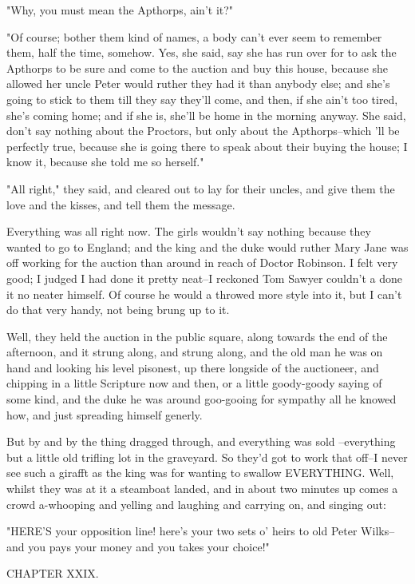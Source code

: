 "Why, you must mean the Apthorps, ain't it?"

"Of course; bother them kind of names, a body can't ever seem to remember
them, half the time, somehow.  Yes, she said, say she has run over for to
ask the Apthorps to be sure and come to the auction and buy this house,
because she allowed her uncle Peter would ruther they had it than anybody
else; and she's going to stick to them till they say they'll come, and
then, if she ain't too tired, she's coming home; and if she is, she'll be
home in the morning anyway.  She said, don't say nothing about the
Proctors, but only about the Apthorps--which 'll be perfectly true,
because she is going there to speak about their buying the house; I know
it, because she told me so herself."

"All right," they said, and cleared out to lay for their uncles, and give
them the love and the kisses, and tell them the message.

Everything was all right now.  The girls wouldn't say nothing because
they wanted to go to England; and the king and the duke would ruther Mary
Jane was off working for the auction than around in reach of Doctor
Robinson.  I felt very good; I judged I had done it pretty neat--I
reckoned Tom Sawyer couldn't a done it no neater himself.  Of course he
would a throwed more style into it, but I can't do that very handy, not
being brung up to it.

Well, they held the auction in the public square, along towards the end
of the afternoon, and it strung along, and strung along, and the old man
he was on hand and looking his level pisonest, up there longside of the
auctioneer, and chipping in a little Scripture now and then, or a little
goody-goody saying of some kind, and the duke he was around goo-gooing
for sympathy all he knowed how, and just spreading himself generly.

But by and by the thing dragged through, and everything was sold
--everything but a little old trifling lot in the graveyard.  So they'd got
to work that off--I never see such a girafft as the king was for wanting
to swallow EVERYTHING.  Well, whilst they was at it a steamboat landed,
and in about two minutes up comes a crowd a-whooping and yelling and
laughing and carrying on, and singing out:

"HERE'S your opposition line! here's your two sets o' heirs to old Peter
Wilks--and you pays your money and you takes your choice!"




CHAPTER XXIX.


